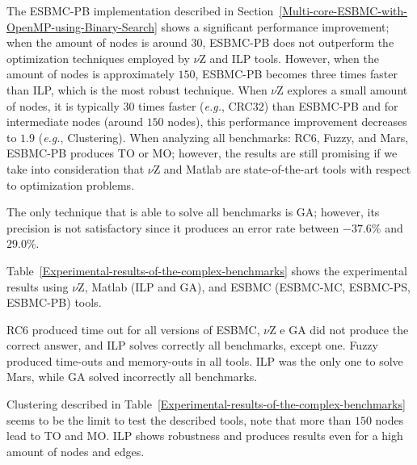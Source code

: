 The ESBMC-PB implementation described in Section~\ref{Multi-core-ESBMC-with-OpenMP-using-Binary-Search} shows a significant performance improvement; when the amount of nodes is around $30$, ESBMC-PB does not outperform the optimization techniques employed by $\nu$Z and ILP tools. However, when the amount of nodes is approximately $150$, ESBMC-PB becomes three times faster than ILP, which is the most robust technique. When $\nu$Z explores a small amount of nodes, it is typically $30$ times faster ({\it e.g.}, CRC$32$) than ESBMC-PB and for intermediate nodes (around $150$ nodes), this performance improvement decreases to $1$.$9$ ({\it e.g.}, Clustering). When analyzing all benchmarks: RC$6$, Fuzzy, and Mars, ESBMC-PB produces TO or MO; however, the results are still promising if we take into consideration that $\nu$Z and Matlab are state-of-the-art tools with respect to optimization problems.

The only technique that is able to solve all benchmarks is GA; however, its precision is not satisfactory since it produces an error rate between $-37.6$\% and $29.0$\%.

Table~\ref{Experimental-results-of-the-complex-benchmarks} shows the experimental results using $\nu$Z, Matlab (ILP and GA), and ESBMC (ESBMC\hyp{}MC, ESBMC\hyp{}PS, ESBMC\hyp{}PB) tools.

RC$6$ produced time out for all versions of ESBMC, $\nu$Z e GA did not produce the correct answer, and ILP solves correctly all benchmarks, except one. Fuzzy produced time-outs and memory-outs in all tools. ILP was the only one to solve Mars, while GA solved incorrectly all benchmarks.

Clustering described in Table~\ref{Experimental-results-of-the-complex-benchmarks} seems to be the limit to test the described tools, note that more than $150$ nodes lead to TO and MO. ILP shows robustness and produces results even for a high amount of nodes and edges.

